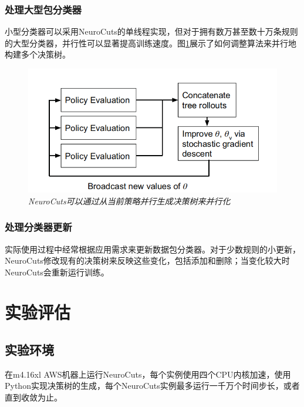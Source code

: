 \documentclass[UTF8,a4paper]{ctexart}
\begin{document}
\subsubsection{处理大型包分类器}
小型分类器可以采用NeuroCuts的单线程实现，但对于拥有数万甚至数十万条规则的大型分类器，并行性可以显著提高训练速度。图\ref{fig:003}展示了如何调整算法来并行地构建多个决策树。
\begin{figure}[H]
    \centering
    \includegraphics[width = \textwidth]{image009.png}
    \caption{\em NeuroCuts可以通过从当前策略并行生成决策树来并行化}
    \label{fig:003}
\end{figure}
\subsubsection{处理分类器更新}
实际使用过程中经常根据应用需求来更新数据包分类器。对于少数规则的小更新，NeuroCuts修改现有的决策树来反映这些变化，包括添加和删除；当变化较大时NeuroCuts会重新运行训练。
\section{实验评估}
\subsection{实验环境}
在m4.16xl AWS机器上运行NeuroCuts，每个实例使用四个CPU内核加速，使用Python实现决策树的生成，每个NeuroCuts实例最多运行一千万个时间步长，或者直到收敛为止。
\end{document}
